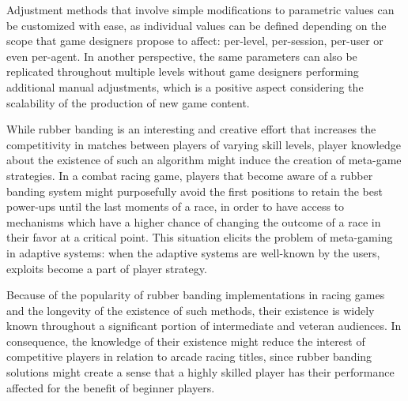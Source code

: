 Adjustment methods that involve simple modifications to parametric values can be customized with ease, as individual values can be defined depending on the scope that game designers propose to affect: per-level, per-session, per-user or even per-agent. In another perspective, the same parameters can also be replicated throughout multiple levels without game designers performing additional manual adjustments, which is a positive aspect considering the scalability of the production of new game content.


While rubber banding is an interesting and creative effort that increases the competitivity in matches between players of varying skill levels, player knowledge about the existence of such an algorithm might induce the creation of meta-game strategies. In a combat racing game, players that become aware of a rubber banding system might purposefully avoid the first positions to retain the best power-ups until the last moments of a race, in order to have access to mechanisms which have a higher chance of changing the outcome of a race in their favor at a critical point. This situation elicits the problem of meta-gaming in adaptive systems: when the adaptive systems are well-known by the users, exploits become a part of player strategy.

Because of the popularity of rubber banding implementations in racing games and the longevity of the existence of such methods, their existence is widely known throughout a significant portion of intermediate and veteran audiences. In consequence, the knowledge of their existence might reduce the interest of competitive players in relation to arcade racing titles, since rubber banding solutions might create a sense that a highly skilled player has their performance affected for the benefit of beginner players.


